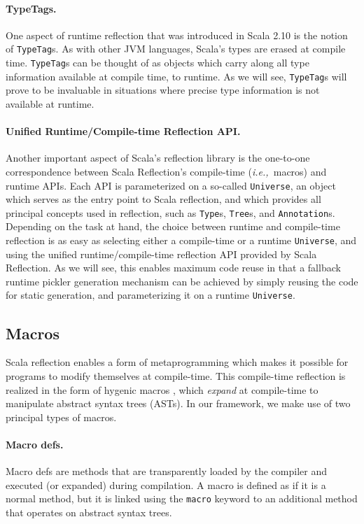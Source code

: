 \documentclass[preprint,10pt]{sigplanconf}
\theoremstyle{definition}
\newcommand{\ie}{{\em i.e.,~}}
\begin{document}
\paragraph{TypeTags.} One aspect of runtime reflection that was introduced in
Scala 2.10 is the notion of \verb|TypeTag|s. As with other JVM languages,
Scala's types are erased at compile time. \verb|TypeTag|s can be thought of as
objects which carry along all type information available at compile time, to
runtime. As we will see, \verb|TypeTag|s will prove to be invaluable in
situations where precise type information is not available at runtime.

\paragraph{Unified Runtime/Compile-time Reflection API.} Another important
aspect of Scala's reflection library is the one-to-one correspondence between
Scala Reflection's compile-time (\ie macros) and runtime APIs. Each API is
parameterized on a so-called \verb|Universe|, an object which serves as the
entry point to Scala reflection, and which provides all principal concepts
used in reflection, such as \verb|Type|s, \verb|Tree|s, and
\verb|Annotation|s. Depending on the task at hand, the choice between runtime
and compile-time reflection is as easy as selecting either a compile-time or a
runtime \verb|Universe|, and using the unified runtime/compile-time reflection
API provided by Scala Reflection. As we will see, this enables maximum code
reuse in that a fallback runtime pickler generation mechanism can be achieved
by simply reusing the code for static generation, and parameterizing it on a
runtime \verb|Universe|.


\subsection{Macros}
\label{sec:macros}

Scala reflection enables a form of metaprogramming which makes it possible for
programs to modify themselves at compile-time. This compile-time reflection is
realized in the form of hygenic macros \cite{Burmako2012}, which {\em expand}
at compile-time to manipulate abstract syntax trees (ASTs). In our framework, we make
use of two principal types of macros.

\paragraph{Macro defs.} Macro defs are methods that are transparently loaded
by the compiler and executed (or expanded) during compilation. A macro is
defined as if it is a normal method, but it is linked using the \verb|macro|
keyword to an additional method that operates on abstract syntax trees.
\end{document}
